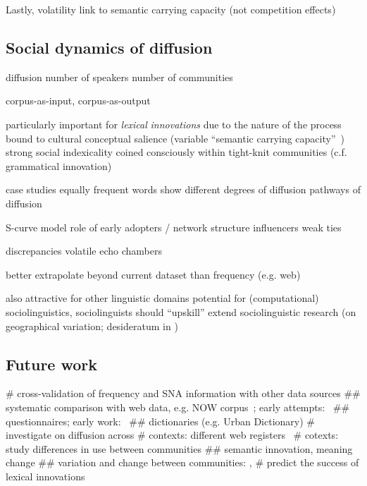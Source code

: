 \documentclass[
  a4paper,
  abstract=on,
  captions=tableabove
  ]{scrartcl}
\begin{document}
    Lastly,
    volatility
      link to semantic carrying capacity (not competition effects)


  \subsection{Social dynamics of diffusion}

    diffusion
      number of speakers
      number of communities

    corpus-as-input, corpus-as-output \parencite{Stefanowitsch2017CorpusbasedPerspective}

    particularly important for \emph{lexical} \emph{innovations} due to the nature of the process
        bound to cultural conceptual salience (variable \enquote{semantic carrying capacity}~\parencite{Nini2017ApplicationGrowth})
        strong social indexicality
        coined consciously within tight-knit communities (c.f. grammatical innovation)

    case studies
      equally frequent words show different
        degrees of diffusion
        pathways of diffusion

    S-curve model
      role of early adopters / network structure
      influencers
      weak ties

    discrepancies
      volatile
      echo chambers

    better extrapolate beyond current dataset than frequency (e.g. web)


    also attractive for other linguistic domains
      potential for (computational) sociolinguistics, sociolinguists should \enquote{upskill}
      extend sociolinguistic research (on geographical variation; desideratum in \cite{Grieve2019MappingLexical})


  \subsection{Future work}

    \begin{qitem}
      # cross-validation of frequency and SNA information with other data sources
        ## systematic comparison with web data, e.g. NOW corpus~\parencite{Davies2013CorpusNews}; early attempts:~\cite{Wurschinger2016UsingWeb}
        ## questionnaires; early work:~\cite{Kerremans2015WebNew}
        ## dictionaries (e.g. Urban Dictionary)
      # investigate on diffusion across
        # contexts: different web registers~\parencite{Biber2016RegisterVariation}
        # cotexts: study differences in use between communities
          ## semantic innovation, meaning change
          ## variation and change between communities: \cite{Tredici2019YouShall}, \cite{Schmid2020BattlingSemantica}
      # predict the success of lexical innovations
    \end{qitem}
\end{document}

